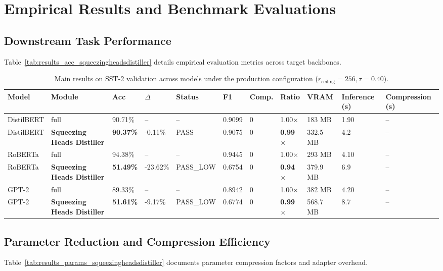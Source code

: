 \section{Empirical Results and Benchmark Evaluations}

\subsection{Downstream Task Performance}
Table~\ref{tab:results_acc_squeezingheadsdistiller} details empirical evaluation metrics across target backbones.

\begin{table}[t]
\centering
\small
\begin{tabular}{lllllllllll}
\toprule
\textbf{Model} & \textbf{Module} & \textbf{Acc} & \textbf{$\Delta$} & \textbf{Status} & \textbf{F1} & \textbf{Comp.} & \textbf{Ratio} & \textbf{VRAM} & \textbf{Inference (s)} & \textbf{Compression (s)} \\
\midrule
DistilBERT & full & 90.71\% & -- & -- & 0.9099 & 0 & 1.00$\times$ & 183 MB & 1.90 & -- \\
DistilBERT & \textbf{Squeezing Heads Distiller} & \textbf{90.37\%} & -0.11\% & PASS & 0.9075 & 0 & \textbf{0.99$\times$} & 332.5 MB & 4.2 & -- \\
RoBERTa & full & 94.38\% & -- & -- & 0.9445 & 0 & 1.00$\times$ & 293 MB & 4.10 & -- \\
RoBERTa & \textbf{Squeezing Heads Distiller} & \textbf{51.49\%} & -23.62\% & PASS_LOW & 0.6754 & 0 & \textbf{0.94$\times$} & 379.9 MB & 6.9 & -- \\
GPT-2 & full & 89.33\% & -- & -- & 0.8942 & 0 & 1.00$\times$ & 382 MB & 4.20 & -- \\
GPT-2 & \textbf{Squeezing Heads Distiller} & \textbf{51.61\%} & -9.17\% & PASS_LOW & 0.6774 & 0 & \textbf{0.99$\times$} & 568.7 MB & 8.7 & -- \\
\bottomrule
\end{tabular}
\caption{Main results on SST-2 validation across models under the production configuration ($r_{\mathrm{ceiling}}=256, \tau=0.40$).}
\label{tab:main_sst2}
\end{table}

\subsection{Parameter Reduction and Compression Efficiency}
Table~\ref{tab:results_params_squeezingheadsdistiller} documents parameter compression factors and adapter overhead.

